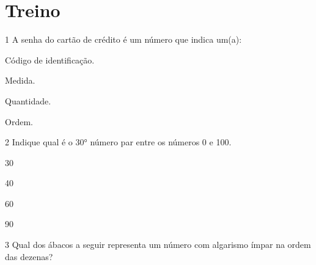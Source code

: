 


\section*{Treino}

\num{1} A senha do cartão de crédito é um número que indica um(a):

\begin{escolha}[itemsep=+2pt]
\item Código de identificação.

\item Medida.

\item Quantidade.

\item Ordem.
\end{escolha}

\num{2} Indique qual é o 30° número par entre os números 0 e 100.

\begin{escolha}[itemsep=+2pt]
\item 30

\item 40

\item 60

\item 90
\end{escolha}

\pagebreak
\num{3} Qual dos ábacos a seguir representa um número com algarismo ímpar na ordem
das dezenas?

